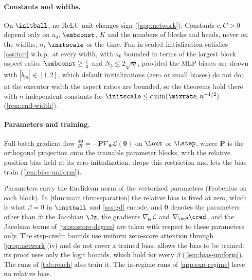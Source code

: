 \paragraph{Constants and widths.} On $\initball$, no ReLU unit changes sign (\cref{app:network}). Constants $c,C>0$ depend only on $a_0$, $\embconst$, $K$
and the numbers of blocks and heads, never on the widths, $n$, $\initscale$ or the time. Fan-in-scaled initialization
satisfies \cref{ass:init} w.h.p.\ at every width, with $a_0$ bounded in terms of the largest block aspect ratio,
$\embconst\ge\tfrac{1}{2}$ and $N_b\le2\sqrt w$, provided the MLP biases are drawn with $|\tilde b_m|\in[1,2]$, which default
initializations (zero or small biases) do not do; at the executor width the aspect ratios are bounded, so the theorems
hold there with $n$-independent constants for $\initscale\le c\min(\mixrate,n^{-1/2})$ (\cref{rem:end-width}).

\paragraph{Parameters and training.}

\begin{assumption}[Training]
\label{ass:gd}
Full-batch gradient flow $\tfrac{d\bm\theta}{dt}=-\mathbf P\nabla_{\bm\theta}\mathcal L(\bm\theta)$ on $\Lout$ or $\Lstep$, where $\mathbf P$ is the orthogonal projection onto
the trainable parameter blocks, with the relative
position bias held at its zero initialization.  drops this restriction and lets the bias train (\cref{lem:bias-uniform}).
\end{assumption}

\label{rem:norms}Parameters carry the Euclidean norm of the vectorized parameters (Frobenius on
each block). In \cref{thm:main,thm:separation} the relative bias is fixed at zero, which is what $\beta=0$ in $\initball$ and
\cref{ass:gd} encode, and $\bm\theta$ denotes the parameters other than $\beta$: the Jacobian $\Jz$, the gradients $\nabla_{\bm\theta}\mathcal L$ and
$\nabla_{\bm\theta}\cred$, and the Jacobian terms of \cref{prop:score-degree} are taken with respect to these parameters only. The step-credit bounds use uniform
zero-score attention through \cref{prop:network}(iv) and do not cover a trained bias.  allows the bias to be
trained: its proof uses only the logit bounds, which hold for every $\beta$ (\cref{lem:bias-uniform}). The runs of \cref{tab:reach} also train it. The in-regime runs of \cref{app:exp-regime} have no relative bias.


